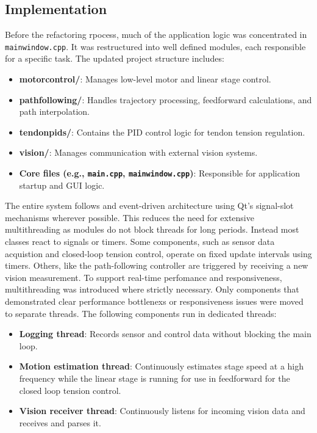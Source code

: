 \subsection{Implementation}
Before the refactoring rpocess, much of the application logic was concentrated in \texttt{mainwindow.cpp}. It was restructured into well defined modules, each responsible for a specific task. The updated project structure includes:
\begin{itemize}
    \item \textbf{motorcontrol/}: Manages low-level motor and linear stage control.
    \item \textbf{pathfollowing/}: Handles trajectory processing, feedforward calculations, and path interpolation.
    \item \textbf{tendonpids/}: Contains the PID control logic for tendon tension regulation.
    \item \textbf{vision/}: Manages communication with external vision systems.
    \item \textbf{Core files (e.g., \texttt{main.cpp}, \texttt{mainwindow.cpp})}: Responsible for application startup and GUI logic.
\end{itemize}

The entire system follows and event-driven architecture using Qt's signal-slot mechanisms wherever possible. This reduces the need for extensive multithreading as modules do not block threads for long periods. Instead most classes react to signals or timers. Some components, such as sensor data acquistion and closed-loop tension control, operate on fixed update intervals using timers. Others, like the path-following controller are triggered by receiving a new vision measurement.
\newline \newline
To support real-time perfomance and responsiveness, multithreading was introduced where strictly necessary. Only components that demonstrated clear performance bottlenexs or responsiveness issues were moved to separate threads. The following components run in dedicated threads:
\begin{itemize}
    \item \textbf{Logging thread}: Records sensor and control data without blocking the main loop.
    \item \textbf{Motion estimation thread}: Continuously estimates stage speed at a high frequency while the linear stage is running for use in feedforward for the closed loop tension control.
    \item \textbf{Vision receiver thread}: Continuously listens for incoming vision data and receives and parses it.
\end{itemize}


